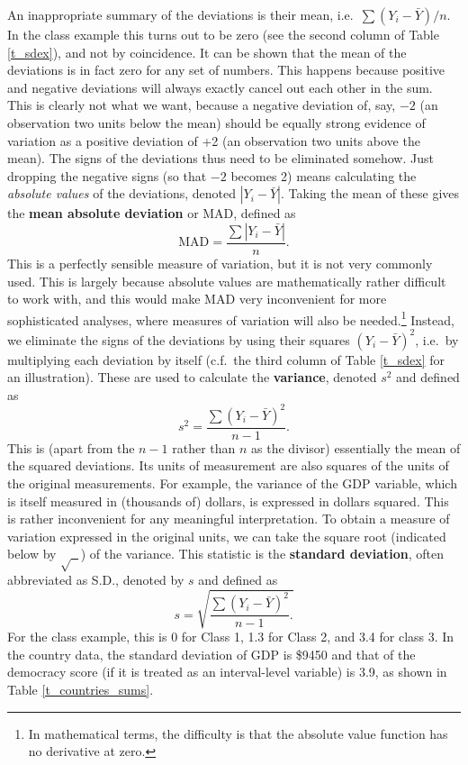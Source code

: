 An inappropriate summary of the deviations is their mean, i.e.\ $\sum
(Y_{i}-\bar{Y})/n$. In the class example this turns out to be zero (see
the second column of Table \ref{t_sdex}), and not by coincidence. It can
be shown that the mean of the deviations is in fact zero for any set of
numbers. This happens because positive and negative deviations will
always exactly cancel out each other in the sum. This is clearly not
what we want, because a negative deviation of, say, $-2$ (an observation
two units below the mean) should be equally strong evidence of variation
as a positive deviation of +2 (an observation two units above the mean).
The signs of the deviations thus need to be eliminated somehow.
Just dropping the negative signs (so that $-2$ becomes 2)
means calculating the
\emph{absolute values} of the deviations, denoted $|Y_{i}-\bar{Y}|$.
Taking the mean of these gives the \textbf{mean absolute deviation} or
MAD, defined as
\[
\text{MAD}=\frac{\sum |Y_{i}-\bar{Y}|}{n}.
\]
This is a perfectly sensible measure of variation, but it is not very commonly
used. This is largely because absolute values are mathematically rather
difficult to work with, and this would make MAD very inconvenient for
more sophisticated analyses, where measures of variation will also be
needed.\footnote{In mathematical terms, the difficulty is that the
absolute value function has no derivative at zero.} Instead, we
eliminate the signs of the deviations by using their squares
$(Y_{i}-\bar{Y})^{2}$, i.e.\ by multiplying each deviation by itself (c.f.\
the third column of Table \ref{t_sdex} for an illustration). These are
used to calculate the \textbf{variance}, denoted $s^{2}$ and defined as
\begin{equation}
s^{2} = \frac{\sum (Y_{i}-\bar{Y})^{2}}{n-1}.
\label{samplevar}
\end{equation}
This is (apart from the $n-1$ rather than $n$ as the divisor)
essentially the mean of the squared deviations. Its
units of measurement are also squares of the units of the original
measurements. For example, the variance of the GDP variable, which is
itself measured in (thousands of) dollars, is expressed in dollars
squared. This is rather inconvenient for any meaningful interpretation.
To obtain a measure of variation expressed in
the original units, we can take the square root
(indicated below by $\sqrt{\; \; }$) of the variance. This statistic is
the \textbf{standard deviation}, often abbreviated as S.D., denoted by
$s$ and defined as
\begin{equation}
s = \sqrt{\frac{\sum (Y_{i}-\bar{Y})^{2}}{n-1}.}
\label{sd}
\end{equation}
For the class example, this is 0 for Class 1, 1.3 for Class 2,
and 3.4 for class 3. In the country data, the standard deviation of
GDP is \$9450 and that of the democracy score (if it is treated as
an interval-level variable) is 3.9, as shown in Table
\ref{t_countries_sums}.

